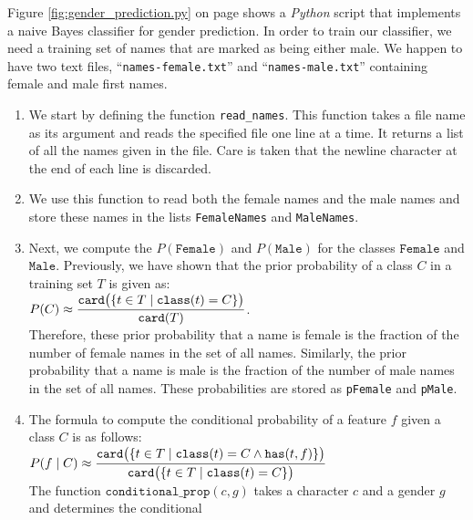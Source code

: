 Figure \ref{fig:gender_prediction.py} on page \pageref{fig:gender_prediction.py} shows a \textsl{Python} script
that implements a naive Bayes classifier for gender prediction.   In order to train our classifier, we need a
training set of names that are marked as being either male. We happen to have two text files, ``\texttt{names-female.txt}''
and ``\texttt{names-male.txt}'' containing female and male first names.
\begin{enumerate}
\item We start by defining the function \texttt{read\_names}. This
      function takes a file name as its argument and reads the specified file one line at a time.  It returns a
      list of all the names given in the file. Care is taken that the newline character at the end of each line
      is discarded. 
\item We use this function to read both the female names and the male names and store these names in the lists
      \texttt{FemaleNames} and \texttt{MaleNames}.
\item Next, we compute the  $P(\texttt{Female})$ and $P(\texttt{Male})$ for the classes
      $\texttt{Female}$ and $\texttt{Male}$.  Previously, we have shown that the prior probability of a class $C$
      in a training set $T$ is given as: 
      \\[0.2cm]
      \hspace*{1.3cm}
      $\displaystyle P(C) \approx  \frac{\texttt{card}\bigl(\{t \in T \;|\; \texttt{class}(t) = C \}\bigr)}{\texttt{card}(T)}$.
      \\[0.2cm]
      Therefore, these prior probability that a name is female is the fraction of the number of female names in
      the set of all names.  Similarly, the prior probability that a name is male is the fraction of the number
      of male names in  the set of all names.  These probabilities are stored as \texttt{pFemale} and \texttt{pMale}.
\item The formula to compute the conditional probability of a feature $f$ given a class $C$ is as follows:
      \\[0.2cm]
      \hspace*{1.3cm}
      $\displaystyle P(f\;|\;C) \approx 
         \frac{\texttt{card}\bigl(\{t \in T \;|\; \texttt{class}(t) = C \wedge \texttt{has}(t, f) \}\bigr)}{
         \texttt{card}\bigl(\{t \in T \;|\; \texttt{class}(t) = C \}\bigr)} 
      $
      \\[0.2cm]
      The function $\texttt{conditional\_prop}(c,g)$ takes a character $c$ and a gender $g$ and determines the conditional

\end{enumerate}
